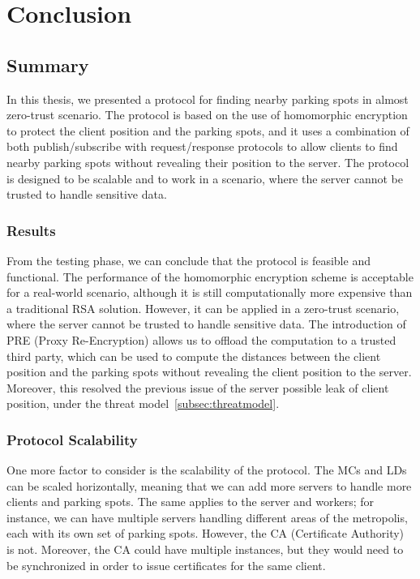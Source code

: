 \chapter{Conclusion}

\section{Summary}

In this thesis, we presented a protocol for finding nearby parking spots in almost zero-trust scenario. The protocol is based on the use of homomorphic encryption to protect the client position and the parking spots, and it uses a combination of both publish/subscribe with request/response protocols to allow clients to find nearby parking spots without revealing their position to the server. The protocol is designed to be scalable and to work in a scenario, where the server cannot be trusted to handle sensitive data.

\subsection{Results}

From the testing phase, we can conclude that the protocol is feasible and functional. The performance of the homomorphic encryption scheme is acceptable for a real-world scenario, although it is still computationally more expensive than a traditional RSA solution. However, it can be applied in a zero-trust scenario, where the server cannot be trusted to handle sensitive data. The introduction of PRE (Proxy Re-Encryption) allows us to offload the computation to a trusted third party, which can be used to compute the distances between the client position and the parking spots without revealing the client position to the server. Moreover, this resolved the previous issue of the server possible leak of client position, under the threat model~\cref{subsec:threatmodel}.

\subsection{Protocol Scalability}

One more factor to consider is the scalability of the protocol. The MCs and LDs can be scaled horizontally, meaning that we can add more servers to handle more clients and parking spots. The same applies to the server and workers; for instance, we can have multiple servers handling different areas of the metropolis, each with its own set of parking spots. However, the CA (Certificate Authority) is not. Moreover, the CA could have multiple instances, but they would need to be synchronized in order to issue certificates for the same client.

